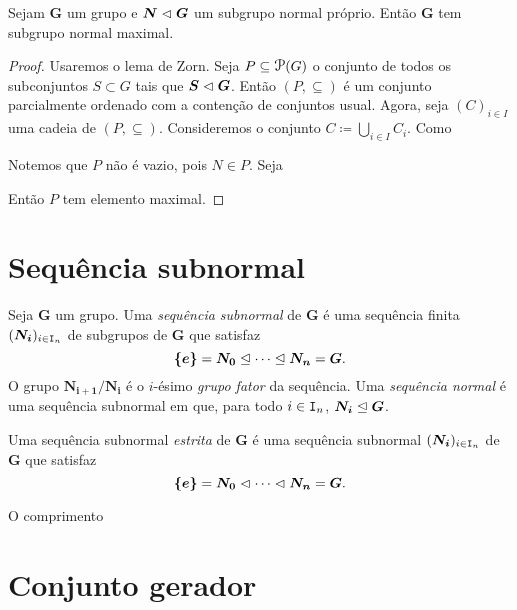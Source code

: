 \begin{conj}
Sejam $\bm G$ um grupo e $\bm N \mathrel{\lhd} \bm G$ um subgrupo normal próprio. Então $\bm G$ tem subgrupo normal maximal.
\end{conj}
\begin{proof}
Usaremos o lema de Zorn. Seja $P \subseteq \p(G)$ o conjunto de todos os subconjuntos $S \subset G$ tais que $\bm S \mathrel{\lhd} \bm G$. Então $(P,\subseteq)$ é um conjunto parcialmente ordenado com a contenção de conjuntos usual. Agora, seja $(C)_{i \in I}$ uma cadeia de $(P,\subseteq)$. Consideremos o conjunto $C \coloneqq \bigcup_{i \in I} C_i$. Como 

Notemos que $P$ não é vazio, pois $N \in P$. Seja 



Então $P$ tem elemento maximal.
\end{proof}






\section{Sequência subnormal}

\begin{defi}
Seja $\bm G$ um grupo. Uma \emph{sequência subnormal} de $\bm G$ é uma sequência finita $(\bm{N_i})_{i \in \mathtt I_n}$ de subgrupos de $\bm G$ que satisfaz
	\begin{equation*}
	\bm{\{e\}} = \bm{N_0} \mathrel{\unlhd} \cdots \mathrel{\unlhd} \bm{N_n} = \bm G.
	\end{equation*}
O grupo $\bm{N_{i+1}/N_i}$ é o $i$-ésimo \emph{grupo fator} da sequência.
Uma \emph{sequência normal} é uma sequência subnormal em que, para todo $i \in \mathtt I_n$, $\bm{N_i} \mathrel{\unlhd} \bm G$.

Uma sequência subnormal \emph{estrita} de $\bm G$ é uma sequência subnormal $(\bm{N_i})_{i \in \mathtt I_n}$ de $\bm G$ que satisfaz
	\begin{equation*}
	\bm{\{e\}} = \bm{N_0} \mathrel{\lhd} \cdots \mathrel{\lhd} \bm{N_n} = \bm G.
	\end{equation*}
	
O comprimento
\end{defi}



\section{Conjunto gerador}

